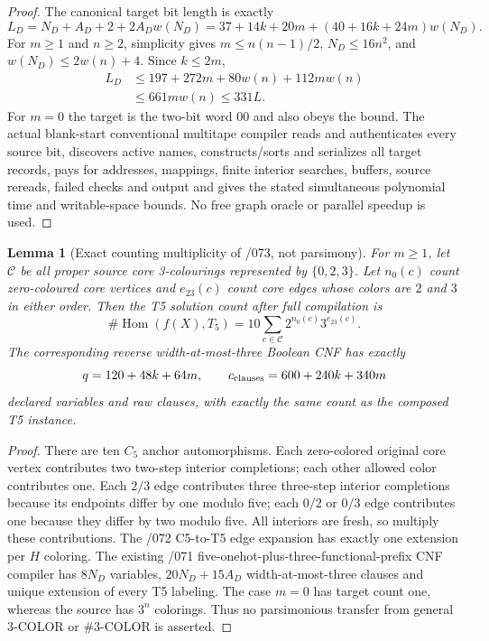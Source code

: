 \documentclass[11pt]{article}
\newtheorem{lemma}{Lemma}
\begin{document}
\begin{proof}
The canonical target bit length is exactly
\[
 L_D=N_D+A_D+2+2A_Dw(N_D)
 =37+14k+20m+(40+16k+24m)w(N_D).
\]
For $m\ge1$ and $n\ge2$, simplicity gives
$m\le n(n-1)/2$, $N_D\le16n^2$, and
$w(N_D)\le2w(n)+4$. Since $k\le2m$,
\[
\begin{split}
 L_D&\le197+272m+80w(n)+112mw(n)\\
    &\le661mw(n)\le331L.
\end{split}
\]
For $m=0$ the target is the two-bit word $00$ and also
obeys the bound. The actual blank-start conventional
multitape compiler reads and authenticates every source bit,
discovers active names, constructs/sorts and serializes
all target records, pays for addresses, mappings, finite
interior searches, buffers, source rereads, failed checks
and output and gives the stated simultaneous polynomial
time and writable-space bounds. No free graph oracle or
parallel speedup is used.
\end{proof}

\begin{lemma}[Exact counting multiplicity of /073, not parsimony]
For $m\ge1$, let $\mathcal C$ be all proper source core
3-colourings represented by $\{0,2,3\}$. Let $n_0(c)$
count zero-coloured core vertices and $e_{23}(c)$ count
core edges whose colors are $2$ and $3$ in either order.
Then the T5 solution count after full compilation is
\[
 \boxed{\#\operatorname{Hom}(f(X),T_5)
  =10\sum_{c\in\mathcal C}2^{n_0(c)}3^{e_{23}(c)}.}
\]
The corresponding reverse width-at-most-three Boolean CNF
has exactly
\[
 q=120+48k+64m,\qquad
 c_{\rm clauses}=600+240k+340m
\]
declared variables and raw clauses, with exactly the same
count as the composed T5 instance.
\end{lemma}
\begin{proof}
There are ten $C_5$ anchor automorphisms.
Each zero-colored original core vertex contributes two
two-step interior completions; each other allowed color
contributes one. Each $2/3$ edge contributes three
three-step interior completions because its endpoints
differ by one modulo five; each $0/2$ or $0/3$ edge
contributes one because they differ by two modulo five.
All interiors are fresh, so multiply these contributions.
The /072 C5-to-T5 edge expansion has exactly one
extension per $H$ coloring. The existing /071
five-onehot-plus-three-functional-prefix CNF compiler
has $8N_D$ variables, $20N_D+15A_D$ width-at-most-three
clauses and unique extension of every T5 labeling.
The case $m=0$ has target count one, whereas the
source has $3^n$ colorings. Thus no parsimonious
transfer from general 3-COLOR or \#3-COLOR is asserted.
\end{proof}
\end{document}

